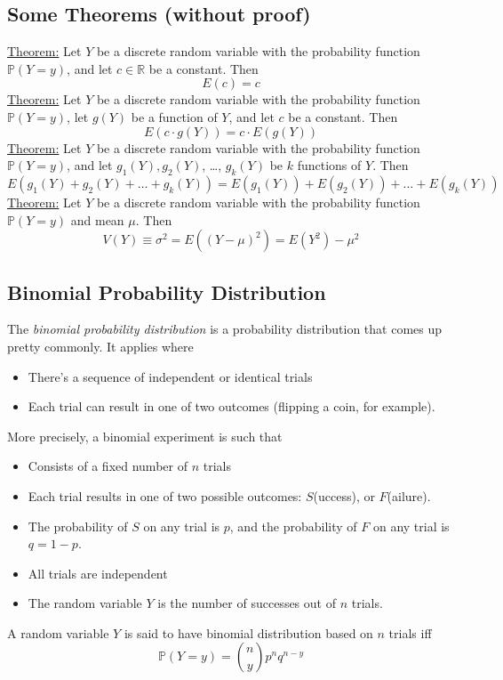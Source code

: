 \documentclass{article}
\newcommand{\ti}[1]{\textit{#1}}
\newcommand{\R}{\mathbb{R}}
\newcommand{\bbP}{\mathbb{P}}
\begin{document}
\subsection{Some Theorems (without proof)}
\underline{Theorem:} Let $Y$ be a discrete random variable with the probability function $\bbP(Y=y)$, and let $c \in \R$ be a constant. Then
\[E(c) = c\]
\underline{Theorem:} Let $Y$ be a discrete random variable with the probability function $\bbP(Y=y)$, let $g(Y)$ be a function of $Y$, and let $c$ be a constant. Then
\[E(c\cdot g(Y)) = c\cdot E(g(Y))\]
\underline{Theorem:} Let $Y$ be a discrete random variable with the probability function $\bbP(Y=y)$, and let $g_{1}(Y), g_{2}(Y)$, \dots, $g_{k}(Y)$ be $k$ functions of $Y$. Then
\[E(g_{1}(Y) + g_{2}(Y) + \dots + g_{k}(Y)) = E(g_{1}(Y)) + E(g_{2}(Y)) + \dots + E(g_{k}(Y))\]
\underline{Theorem:} Let $Y$ be a discrete random variable with the probability function $\bbP(Y=y)$ and mean $\mu$. Then
\[V(Y) \equiv \sigma^{2} = E((Y-\mu)^{2}) = E(Y^{2})-\mu^{2}\]
\subsection{Binomial Probability Distribution}
The \ti{binomial probability distribution} is a probability distribution that comes up pretty commonly. It applies where
\begin{itemize}
	\item There's a sequence of independent or identical trials
	\item Each trial can result in one of two outcomes (flipping a coin, for example).
\end{itemize}
More precisely, a binomial experiment is such that
\begin{itemize}
	\item Consists of a fixed number of $n$ trials
	\item Each trial results in one of two possible outcomes: $S$(uccess), or $F$(ailure).
	\item The probability of $S$ on any trial is $p$, and the probability of $F$ on any trial is $q=1-p$.
	\item All trials are independent
	\item The random variable $Y$ is the number of successes out of $n$ trials.
\end{itemize}
A random variable $Y$ is said to have binomial distribution based on $n$ trials iff
\[\bbP(Y=y) = {n\choose{y}}p^{n}q^{n-y}\]

\newpage
\end{document}

